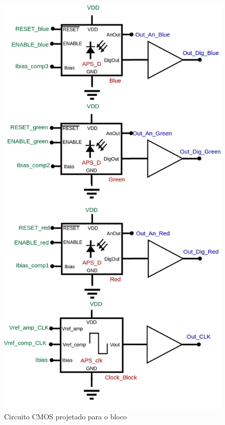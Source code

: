 \begin{figure}[htb]
 \label{\NomePFig}
 \centering
    \centering
    \caption{Circuito CMOS projetado para o bloco \NomeBloco} 
    \includegraphics[scale=0.3]{Circuitos/APS_3.png}
\end{figure}

